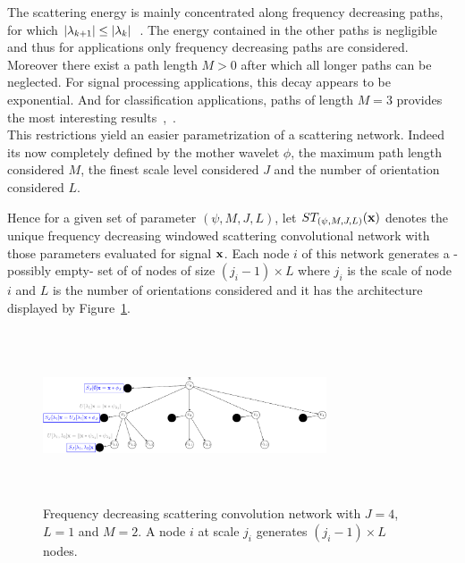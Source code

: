 \documentclass{article}
\begin{document}
    The scattering energy is mainly concentrated along frequency decreasing paths, \ie for which $\left| \lambda_{k+1} \right| \leq \left| \lambda_{k} \right|$~\cite{mallat gis}. The energy contained in the other paths is negligible and thus for applications only frequency decreasing paths are considered. Moreover there exist a path length $M > 0$ after which all longer paths can be neglected. For signal processing applications, this decay appears to be exponential. And for classification applications, paths of length $M = 3$ provides the most interesting results~\citep{anden2011multiscale},~\citep{bruna2010classification}.\\
      
    This restrictions yield an easier parametrization of a scattering network. Indeed its now completely defined by the mother wavelet $\phi$, the maximum path length considered $M$, the finest scale level considered $J$ and the number of orientation considered $L$.
      
    Hence for a given set of parameter $(\psi, M,J,L)$, let $ST_{(\psi, M,J,L)}({\bf x})$ denotes the unique frequency decreasing windowed scattering convolutional network with those parameters evaluated for signal ${\bf x}$. Each node $i$ of this network generates a -possibly empty- set of of nodes of size $(j_{i}-1) \times L$ where $j_{i}$ is the scale of node $i$ and $L$ is the number of orientations considered and it has the architecture displayed by Figure~\ref{fig:SCN 2}.

    \begin{figure}
			\begin{center}
				\includegraphics[width=3.3in, height=2in, keepaspectratio]{ST_freqDec_crop.pdf}
				\caption[Frequency decreasing scattering convolution network.]{\centering  Frequency decreasing scattering convolution network 	with $J=4$, $L=1$ and $M=2$. A node $i$ at scale $j_{i}$ generates $(j_{i}-1) \times L$ nodes. }
				\label{fig:SCN 2}
			\end{center}
      \vspace{-15pt}
    \end{figure}
\end{document}
